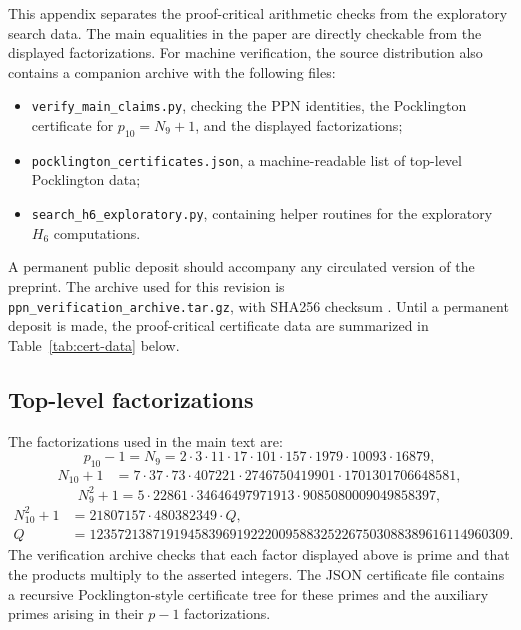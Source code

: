 \documentclass[11pt]{amsart}
\theoremstyle{plain}
\theoremstyle{definition}
\theoremstyle{remark}
\begin{document}
This appendix separates the proof-critical arithmetic checks from the exploratory search data.  The main equalities in the paper are directly checkable from the displayed factorizations.  For machine verification, the source distribution also contains a companion archive with the following files:
\begin{itemize}
    \item \texttt{verify\_main\_claims.py}, checking the PPN identities, the Pocklington certificate for $p_{10}=N_9+1$, and the displayed factorizations;
    \item \texttt{pocklington\_certificates.json}, a machine-readable list of top-level Pocklington data;
    \item \texttt{search\_h6\_exploratory.py}, containing helper routines for the exploratory $H_6$ computations.
\end{itemize}
A permanent public deposit should accompany any circulated version of the preprint.  The archive used for this revision is \texttt{ppn\_verification\_archive.tar.gz}, with SHA256 checksum \texttt{}.  Until a permanent deposit is made, the proof-critical certificate data are summarized in Table~\ref{tab:cert-data} below.

\subsection{Top-level factorizations}
The factorizations used in the main text are:
\[
        p_{10}-1=N_9
        =2\cdot3\cdot11\cdot17\cdot101\cdot157\cdot1979\cdot10093\cdot16879,
\]
\[
\begin{aligned}
        N_{10}+1
        &=7\cdot37\cdot73\cdot407221\cdot2746750419901\cdot1701301706648581,
\end{aligned}
\]
\[
        N_9^2+1
        =5\cdot22861\cdot34646497971913\cdot9085080009049858397,
\]
\[
\begin{aligned}
        N_{10}^2+1 &=21807157\cdot480382349\cdot Q,\\
        Q &= {\scriptstyle 123572138719194583969192220095883252267503088389616114960309}.
\end{aligned}
\]
The verification archive checks that each factor displayed above is prime and that the products multiply to the asserted integers.  The JSON certificate file contains a recursive Pocklington-style certificate tree for these primes and the auxiliary primes arising in their $p-1$ factorizations.
\end{document}
